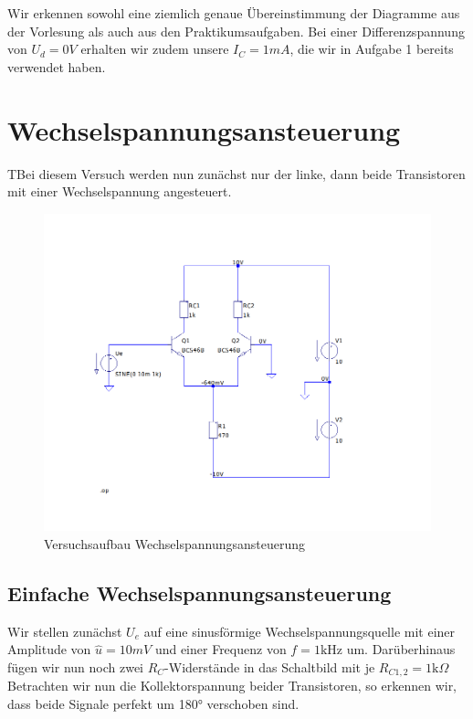 \documentclass{article}
\begin{document}
Wir erkennen sowohl eine ziemlich genaue Übereinstimmung der Diagramme aus der Vorlesung als auch aus den
Praktikumsaufgaben.
Bei einer Differenzspannung von $U_d = 0V$ erhalten wir zudem unsere $I_C = 1 mA$, die wir in Aufgabe 1 bereits
verwendet haben. 
\newpage

\section{Wechselspannungsansteuerung}

\begin{task}
  TBei diesem Versuch werden nun zunächst nur der linke, dann beide Transistoren mit einer Wechselspannung
  angesteuert.
\end{task}

\begin{figure}[h]
  \centering
  \includegraphics[scale=0.5]{../assets/images/EL2P1/DeepinScreenshot_select-area_20210417231020.png}
  \caption{Versuchsaufbau Wechselspannungsansteuerung}
\end{figure}

\subsection{Einfache Wechselspannungsansteuerung}

Wir stellen zunächst $U_e$ auf eine sinusförmige Wechselspannungsquelle mit einer Amplitude von $\hat{u} = 10mV$ und
einer Frequenz von $f = 1\mathrm{kHz}$ um. Darüberhinaus fügen wir nun noch zwei $R_C$-Widerstände in das Schaltbild
mit je $R_{C1,2} = \mathrm{1k}\Omega$ Betrachten wir nun die Kollektorspannung beider Transistoren, so erkennen wir, dass
beide Signale perfekt um 180° verschoben sind.
\end{document}
